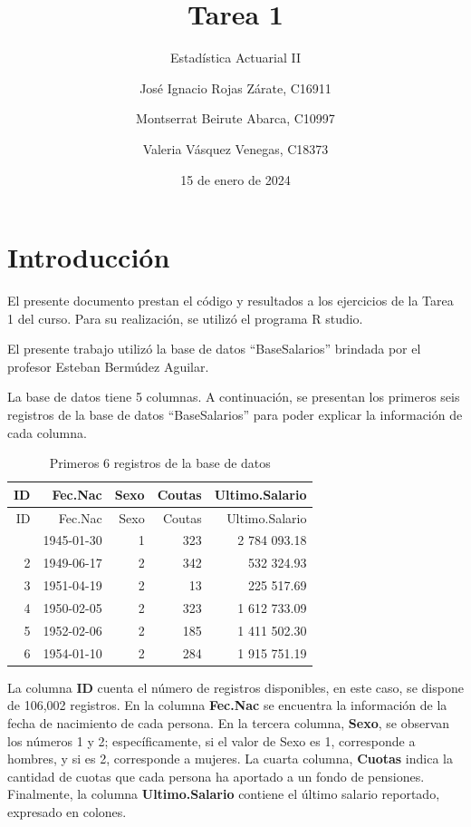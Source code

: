 \documentclass[
]{article}
\title{Tarea 1}
\subtitle{Estadística Actuarial II}
\author{José Ignacio Rojas Zárate, C16911 \and Montserrat Beirute
Abarca, C10997 \and Valeria Vásquez Venegas, C18373}
\date{15 de enero de 2024}
\begin{document}
\maketitle

{
\setcounter{tocdepth}{2}
\tableofcontents
}
\hypertarget{introducciuxf3n}{%
\section{Introducción}\label{introducciuxf3n}}

El presente documento prestan el código y resultados a los ejercicios de
la Tarea 1 del curso. Para su realización, se utilizó el programa R
studio.

El presente trabajo utilizó la base de datos ``BaseSalarios'' brindada
por el profesor Esteban Bermúdez Aguilar.

La base de datos tiene 5 columnas. A continuación, se presentan los
primeros seis registros de la base de datos ``BaseSalarios'' para poder
explicar la información de cada columna.

\begin{longtable}[]{@{}rrrrr@{}}
\caption{Primeros 6 registros de la base de datos}\tabularnewline
\toprule\noalign{}
ID & Fec.Nac & Sexo & Coutas & Ultimo.Salario \\
\midrule\noalign{}
\endfirsthead
\toprule\noalign{}
ID & Fec.Nac & Sexo & Coutas & Ultimo.Salario \\
\midrule\noalign{}
\endhead
\bottomrule\noalign{}
\endlastfoot
1 & 1945-01-30 & 1 & 323 & 2 784 093.18 \\
2 & 1949-06-17 & 2 & 342 & 532 324.93 \\
3 & 1951-04-19 & 2 & 13 & 225 517.69 \\
4 & 1950-02-05 & 2 & 323 & 1 612 733.09 \\
5 & 1952-02-06 & 2 & 185 & 1 411 502.30 \\
6 & 1954-01-10 & 2 & 284 & 1 915 751.19 \\
\end{longtable}

La columna \textbf{ID} cuenta el número de registros disponibles, en
este caso, se dispone de 106,002 registros. En la columna
\textbf{Fec.Nac} se encuentra la información de la fecha de nacimiento
de cada persona. En la tercera columna, \textbf{Sexo}, se observan los
números 1 y 2; específicamente, si el valor de Sexo es 1, corresponde a
hombres, y si es 2, corresponde a mujeres. La cuarta columna,
\textbf{Cuotas} indica la cantidad de cuotas que cada persona ha
aportado a un fondo de pensiones. Finalmente, la columna
\textbf{Ultimo.Salario} contiene el último salario reportado, expresado
en colones.
\end{document}
